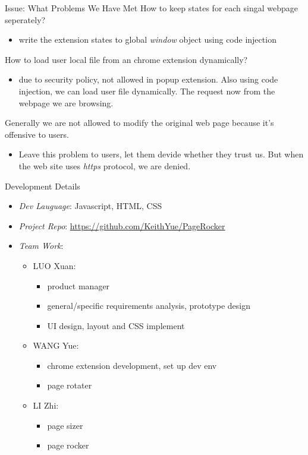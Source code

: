 \documentclass{beamer}
\begin{document}
\begin{frame}{Issue: What Problems We Have Met} How to keep states for each singal webpage seperately?
\begin{itemize}
    \item write the extension states to global \emph{window} object using code injection
\end{itemize}

How to load user local file from an chrome extension dynamically?
\begin{itemize}
    \item due to security policy, not allowed in popup extension. Also using code injection, we can load user file dynamically. The request now from the webpage we are browsing.
\end{itemize}

Generally we are not allowed to modify the original web page because it's offensive to users.
\begin{itemize}
    \item Leave this problem to users, let them devide whether they trust us. But when the web site uses \emph{https} protocol, we are denied.
\end{itemize}

\end{frame}
\begin{frame}{Development Details}
\begin{itemize}
    \item \emph{Dev Lauguage}: Javascript, HTML, CSS
    \item \emph{Project Repo}: \url{https://github.com/KeithYue/PageRocker}
    \item \emph{Team Work}:
        \begin{itemize}
            \item LUO Xuan:
                \begin{itemize}
                    \item product manager
                    \item general/specific requirements analysis, prototype design
                    \item UI design, layout and CSS implement
                \end{itemize}
            \item WANG Yue:
                \begin{itemize}
                    \item chrome extension development, set up dev env
                    \item page rotater
                \end{itemize}
            \item LI Zhi:
                \begin{itemize}
                    \item page sizer
                    \item page rocker
                \end{itemize}
        \end{itemize}
\end{itemize}
\end{frame}
\end{document}
